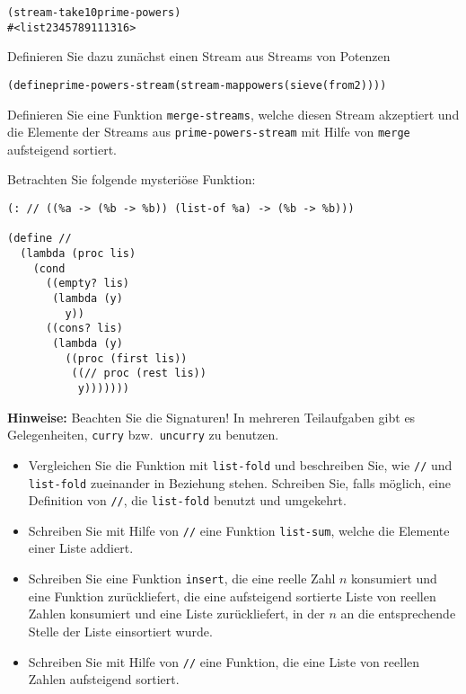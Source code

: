 \begin{aufgabe}
\begin{enumerate}
     \begin{alltt}
(stream-take 10 prime-powers)
\evalsto{} #<list 2 3 4 5 7 8 9 11 13 16>
     \end{alltt}
     Definieren Sie dazu zunächst einen Stream aus Streams von Potenzen
     \begin{alltt}
(define prime-powers-stream (stream-map powers (sieve (from 2))))
     \end{alltt}
     Definieren Sie eine Funktion \texttt{merge-streams}, welche
     diesen Stream akzeptiert und die Elemente der Streams
     aus \texttt{prime-powers-stream} mit Hilfe von \texttt{merge}
     aufsteigend sortiert.
   \end{enumerate}
 \end{aufgabe}

 \begin{aufgabe}
  Betrachten Sie folgende mysteriöse Funktion:
\begin{verbatim}
(: // ((%a -> (%b -> %b)) (list-of %a) -> (%b -> %b)))

(define //
  (lambda (proc lis)
    (cond
      ((empty? lis)
       (lambda (y)
         y))
      ((cons? lis)
       (lambda (y)
         ((proc (first lis))
          ((// proc (rest lis))
           y)))))))
\end{verbatim}
  \textbf{Hinweise:} Beachten Sie die Signaturen! In mehreren
  Teilaufgaben gibt es Gelegenheiten, \texttt{curry} bzw.\
  \texttt{uncurry} zu benutzen.

  \begin{itemize}
  \item Vergleichen Sie die Funktion mit \texttt{list-fold} und
    beschreiben Sie, wie \texttt{//} und \texttt{list-fold} zueinander
    in Beziehung stehen.  Schreiben Sie, falls möglich, eine
    Definition von \texttt{//}, die \texttt{list-fold} benutzt und
    umgekehrt.
  \item Schreiben Sie mit Hilfe von \texttt{//} eine Funktion
    \texttt{list-sum}, welche die Elemente einer Liste addiert.
  \item Schreiben Sie eine Funktion \texttt{insert}, die eine reelle
    Zahl $n$ konsumiert und eine Funktion zurückliefert, die eine
    aufsteigend sortierte Liste von reellen Zahlen konsumiert und
    eine Liste zurückliefert, in der $n$ an die entsprechende
    Stelle der Liste einsortiert wurde.
  \item Schreiben Sie mit Hilfe von \texttt{//} eine Funktion, die
    eine Liste von reellen Zahlen aufsteigend sortiert.
  \end{itemize}
\end{aufgabe}

